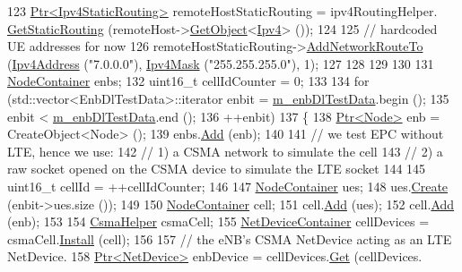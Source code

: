 \begin{DoxyCode}
123   \hyperlink{classns3_1_1Ptr}{Ptr<Ipv4StaticRouting>} remoteHostStaticRouting = ipv4RoutingHelper.
      \hyperlink{classns3_1_1Ipv4StaticRoutingHelper_a731206e50d305695dac7fb2ef963a4bb}{GetStaticRouting} (remoteHost->\hyperlink{classns3_1_1Object_a13e18c00017096c8381eb651d5bd0783}{GetObject}<\hyperlink{classns3_1_1Ipv4}{Ipv4}> ());
124 
125   \textcolor{comment}{// hardcoded UE addresses for now}
126   remoteHostStaticRouting->\hyperlink{classns3_1_1Ipv4StaticRouting_a8bf5eaa7ba49fe33c78c70d5560b6c39}{AddNetworkRouteTo} (\hyperlink{classns3_1_1Ipv4Address}{Ipv4Address} (\textcolor{stringliteral}{"7.0.0.0"}), 
      \hyperlink{classns3_1_1Ipv4Mask}{Ipv4Mask} (\textcolor{stringliteral}{"255.255.255.0"}), 1);
127   
128 
129 
130 
131   \hyperlink{classns3_1_1NodeContainer}{NodeContainer} enbs;
132   uint16\_t cellIdCounter = 0;
133 
134   \textcolor{keywordflow}{for} (std::vector<EnbDlTestData>::iterator enbit = \hyperlink{classEpcS1uDlTestCase_a076410c7636f6081aeaab215a0a1bf9d}{m\_enbDlTestData}.begin ();
135        enbit < \hyperlink{classEpcS1uDlTestCase_a076410c7636f6081aeaab215a0a1bf9d}{m\_enbDlTestData}.end ();
136        ++enbit)
137     \{
138       \hyperlink{classns3_1_1Ptr}{Ptr<Node>} enb = CreateObject<Node> ();
139       enbs.\hyperlink{classns3_1_1NodeContainer_aa60b3a0e70f2fb324e16ffcf8bf31fcb}{Add} (enb);
140 
141       \textcolor{comment}{// we test EPC without LTE, hence we use:}
142       \textcolor{comment}{// 1) a CSMA network to simulate the cell}
143       \textcolor{comment}{// 2) a raw socket opened on the CSMA device to simulate the LTE socket}
144 
145       uint16\_t cellId = ++cellIdCounter;
146 
147       \hyperlink{classns3_1_1NodeContainer}{NodeContainer} ues;
148       ues.\hyperlink{classns3_1_1NodeContainer_a787f059e2813e8b951cc6914d11dfe69}{Create} (enbit->ues.size ());
149 
150       \hyperlink{classns3_1_1NodeContainer}{NodeContainer} cell;
151       cell.\hyperlink{classns3_1_1NodeContainer_aa60b3a0e70f2fb324e16ffcf8bf31fcb}{Add} (ues);
152       cell.\hyperlink{classns3_1_1NodeContainer_aa60b3a0e70f2fb324e16ffcf8bf31fcb}{Add} (enb);
153 
154       \hyperlink{classns3_1_1CsmaHelper}{CsmaHelper} csmaCell;      
155       \hyperlink{classns3_1_1NetDeviceContainer}{NetDeviceContainer} cellDevices = csmaCell.\hyperlink{classns3_1_1CsmaHelper_af79a91372595230b0817200270ab84e7}{Install} (cell);
156 
157       \textcolor{comment}{// the eNB's CSMA NetDevice acting as an LTE NetDevice. }
158       \hyperlink{classns3_1_1Ptr}{Ptr<NetDevice>} enbDevice = cellDevices.\hyperlink{classns3_1_1NetDeviceContainer_a677d62594b5c9d2dea155cc5045f4d0b}{Get} (cellDevices.

\end{DoxyCode}
